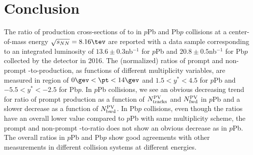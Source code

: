 \section{Conclusion}
\label{conclusion}
The ratio of production cross-sections of \psitwos to \jpsi in $p$Pb and Pb$p$ collisions at a center-of-mass energy $\sqrt{s_{NN}}=8.16\tev$ are reported with a data sample corresponding to an integrated luminosity of $13.6\pm0.3$nb$^{-1}$ for $p$Pb and $20.8\pm0.5$nb$^{-1}$ for Pb$p$ collected by the \lhcb detector in 2016. The (normalized) ratios of prompt and non-prompt \psitwos-to-\jpsi production, as functions of different multiplicity variables, are measured in region of $0\gev<\pt<14\gev$ and $1.5<y^*<4.5$ for $p$Pb and $-5.5<y^*<-2.5$ for Pb$p$. In $p$Pb collisions, we see an obvious decreasing trend for ratio of prompt production as a function of $N_{\rm tracks}^{\rm PV}$ and $N_{\rm fwd}^{\rm PV}$ in $p$Pb and a slower decrease as a function of $N_{\rm bwd}^{\rm PV}$. In Pb$p$ collisions, even though the ratios have an overall lower value compared to $p$Pb with same multiplicity scheme, the prompt and non-prompt \psitwos-to-\jpsi ratio does not show an obvious decrease as in $p$Pb. The overall ratios in $p$Pb and Pb$p$ show good agreements with other measurements in different collision systems at different energies.

